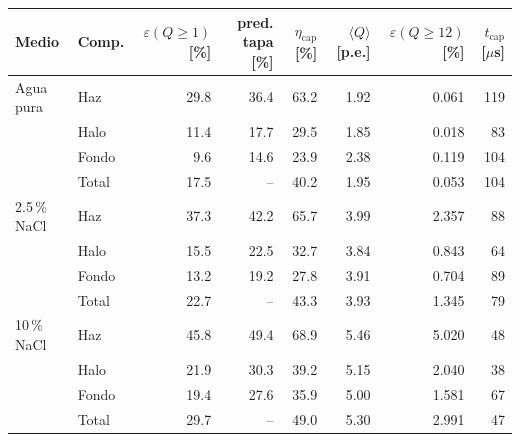 \begin{tabular}{llrrrrrr}
\toprule
Medio & Comp. & $\varepsilon(Q\geq1)$ [\%] & pred. tapa [\%] & $\eta_\text{cap}$ [\%] & $\langle Q\rangle$ [p.e.] & $\varepsilon(Q\geq12)$ [\%] & $t_\text{cap}$ [$\mu$s] \\
\midrule
Agua pura & Haz & 29.8 & 36.4 & 63.2 & 1.92 & 0.061 & 119 \\
 & Halo & 11.4 & 17.7 & 29.5 & 1.85 & 0.018 & 83 \\
 & Fondo & 9.6 & 14.6 & 23.9 & 2.38 & 0.119 & 104 \\
 & Total & 17.5 & -- & 40.2 & 1.95 & 0.053 & 104 \\
\midrule
2.5\,\% NaCl & Haz & 37.3 & 42.2 & 65.7 & 3.99 & 2.357 & 88 \\
 & Halo & 15.5 & 22.5 & 32.7 & 3.84 & 0.843 & 64 \\
 & Fondo & 13.2 & 19.2 & 27.8 & 3.91 & 0.704 & 89 \\
 & Total & 22.7 & -- & 43.3 & 3.93 & 1.345 & 79 \\
\midrule
10\,\% NaCl & Haz & 45.8 & 49.4 & 68.9 & 5.46 & 5.020 & 48 \\
 & Halo & 21.9 & 30.3 & 39.2 & 5.15 & 2.040 & 38 \\
 & Fondo & 19.4 & 27.6 & 35.9 & 5.00 & 1.581 & 67 \\
 & Total & 29.7 & -- & 49.0 & 5.30 & 2.991 & 47 \\
\bottomrule
\end{tabular}
